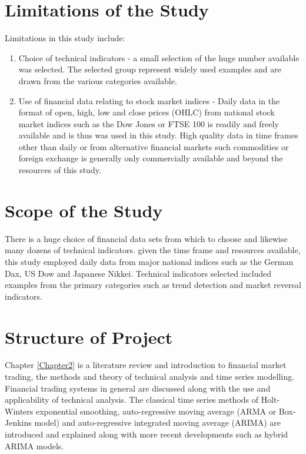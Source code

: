 \section{Limitations of the Study}
Limitations in this study include:
\begin{enumerate}
\item Choice of technical indicators - a small selection of the huge number available was selected. The selected group represent widely used examples and are drawn from the various categories available.
\item Use of financial data relating to stock market indices - Daily data in the format of open, high, low and close prices (OHLC) from national stock market indices such as the Dow Jones or FTSE 100 is readily and freely available and is thus was used in this study. High quality data in time frames other than daily or from alternative financial markets such commodities or foreign exchange is generally only commercially available and beyond the resources of this study.
\end{enumerate}

\section{Scope of the Study }
There is a huge choice of financial data sets from which to choose and likewise many dozens of technical indicators. given the time frame and resources available, this study employed daily data from major national indices such as the German Dax, US Dow and Japanese Nikkei. Technical indicators selected included examples from the primary categories such as trend detection and market reversal indicators.

\section{Structure of Project}
Chapter \ref{Chapter2} is a literature review and introduction to financial market trading, the methods and theory of technical analysis and time series modelling. Financial trading systems in general are discussed along with the use and applicability of technical analysis. The classical time series methods of Holt-Winters exponential smoothing, auto-regressive moving average (ARMA or Box-Jenkins model) and auto-regressive integrated moving average (ARIMA) are introduced and explained along with more recent developments such as hybrid ARIMA models.


